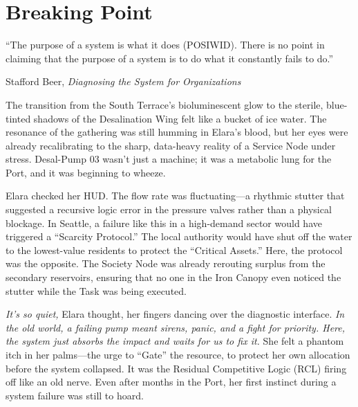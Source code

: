 \chapter{Breaking Point}
\label{chap:06}

\epigraph{“The purpose of a system is what it does (POSIWID). There is no point in claiming that the purpose of a system is to do what it constantly fails to do.”}{Stafford Beer, \textit{Diagnosing the System for Organizations}}


The transition from the South Terrace's bioluminescent glow to the sterile, blue-tinted shadows of the Desalination Wing felt like a bucket of ice water. The resonance of the gathering was still humming in Elara's blood, but her eyes were already recalibrating to the sharp, data-heavy reality of a Service Node under stress. Desal-Pump 03 wasn't just a machine; it was a metabolic lung for the Port, and it was beginning to wheeze.

Elara checked her HUD. The flow rate was fluctuating—a rhythmic stutter that suggested a recursive logic error in the pressure valves rather than a physical blockage. In Seattle, a failure like this in a high-demand sector would have triggered a ``Scarcity Protocol.'' The local authority would have shut off the water to the lowest-value residents to protect the ``Critical Assets.'' Here, the protocol was the opposite. The Society Node was already rerouting surplus from the secondary reservoirs, ensuring that no one in the Iron Canopy even noticed the stutter while the Task was being executed.

\textit{It's so quiet,} Elara thought, her fingers dancing over the diagnostic interface. \textit{In the old world, a failing pump meant sirens, panic, and a fight for priority. Here, the system just absorbs the impact and waits for us to fix it.} She felt a phantom itch in her palms—the urge to ``Gate'' the resource, to protect her own allocation before the system collapsed. It was the Residual Competitive Logic (RCL) firing off like an old nerve. Even after months in the Port, her first instinct during a system failure was still to hoard. 

